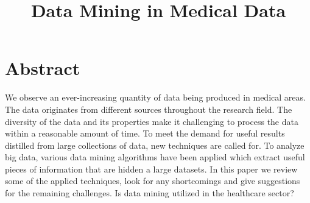 

\renewcommand{\baselinestretch}{1.2} 

\def \thetitle {INF-3701 - Advanced Database Systems}
\def \thesubtitle {Assignment 2}
\def \theauthor {Thomas B Nilsen and Valter Berg}
\def \pagecount {6}


\pagestyle{fancyplain} %
\renewcommand{\headrulewidth}{1pt} %
\renewcommand{\footrulewidth}{0pt}
\lfoot{}\cfoot{Page {\thepage} of \pagecount}\rfoot{}



\title{Data Mining in Medical Data}

\author{
\and
{}
}
\maketitle





\setcounter{page}{1}

\section{Abstract}

We observe an ever-increasing quantity of data being produced in medical areas. The data originates from different sources throughout the research field. The diversity of the data and its properties make it challenging to process the data within a reasonable amount of time. To meet the demand for useful results distilled from large collections of data, new techniques are called for. To analyze big data, various data mining algorithms have been applied which extract useful pieces of information that are hidden a large datasets. In this paper we review some of the applied techniques, look for any shortcomings and give suggestions for the remaining challenges. Is data mining utilized in the healthcare sector? 


